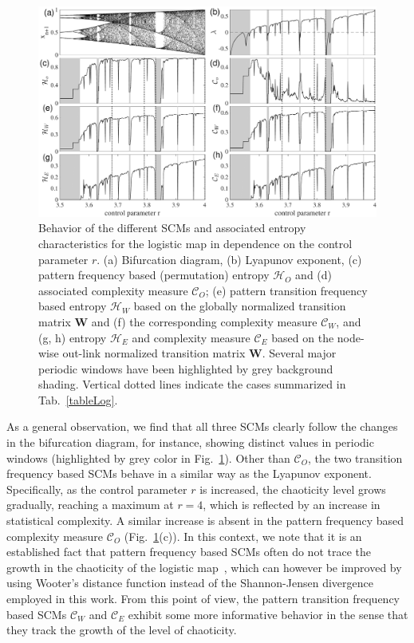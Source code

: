 \documentclass[12pt,aip,cha,reprint,nofootinbib]{revtex4-1}
\begin{document}
\begin{figure}
	\centering 
	\includegraphics[width=2\columnwidth]{logisticEntropy.pdf}
\caption{\small{Behavior of the different SCMs and associated entropy characteristics for the logistic map in dependence on the control parameter $r$. (a) Bifurcation diagram, (b) Lyapunov exponent, (c) pattern frequency based (permutation) entropy $\mathcal{H}_O$ and (d) associated complexity measure $\mathcal{C}_O$; (e) pattern transition frequency based entropy $\mathcal{H}_W$ based on the globally normalized transition matrix $\mathbf{W}$ and (f) the corresponding complexity measure $\mathcal{C}_W$, and (g, h) entropy $\mathcal{H}_E$ and complexity measure $\mathcal{C}_E$ based on the node-wise out-link normalized transition matrix $\mathbf{W}$. Several major periodic windows have been highlighted by grey background shading. Vertical dotted lines indicate the cases summarized in Tab.~\ref{tableLog}. } \label{fig:bifurcation}}
\end{figure}

As a general observation, we find that all three SCMs clearly follow the changes in the bifurcation diagram, for instance, showing distinct values in periodic windows (highlighted by grey color in Fig.~\ref{fig:bifurcation}). Other than $\mathcal{C}_O$, the two transition frequency based SCMs behave in a similar way as the Lyapunov exponent. Specifically, as the control parameter $r$ is increased, the chaoticity level grows gradually, reaching a maximum at $r = 4$, which is reflected by an increase in statistical complexity. A similar increase is absent in the pattern frequency based complexity measure $\mathcal{C}_O$ (Fig.~\ref{fig:bifurcation}(c)). In this context, we note that it is an established fact that pattern frequency based SCMs often do not trace the growth in the chaoticity of the logistic map~\cite{MartinPLA2003}, which can however be improved by using Wooter's distance function instead of the Shannon-Jensen divergence employed in this work. From this point of view, the pattern transition frequency based SCMs $\mathcal{C}_W$ and $\mathcal{C}_E$ exhibit some more informative behavior in the sense that they track the growth of the level of chaoticity. 
\end{document}
